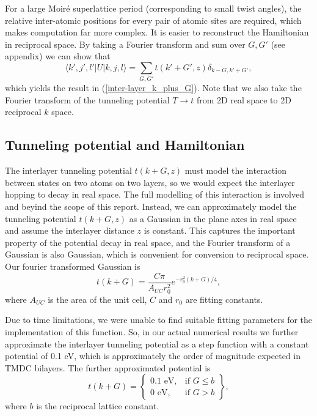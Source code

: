 \documentclass[12pt]{report} %
\begin{document}
  For a large Moir\'e superlattice period (corresponding to small twist angles), the relative inter-atomic positions for every pair of atomic sites are required, which makes computation far more complex. It is easier to reconstruct the Hamiltonian in reciprocal space. By taking a Fourier transform and sum over $G, G'$ (see appendix) we can show that
  \begin{equation}
    \langle k',j',l' | U | k, j, l \rangle = \sum_{G, G'} t(k'+G', z) \delta_{k-G, k'+G'},
    \label{inter-layer_hopping_elements}
  \end{equation}
  which yields the result in (\ref{inter-layer_k_plus_G}). Note that we also take the Fourier transform of the tunneling potential $T \rightarrow t$ from 2D real space to 2D reciprocal $k$ space. 
  
\subsection*{Tunneling potential and Hamiltonian}

The interlayer tunneling potential $t(k + G, z)$ must model the interaction between states on two atoms on two layers, so we would expect the interlayer hopping to decay in real space. The full modelling of this interaction is involved and beyind the scope of this report. Instead, we can approximately model the tunneling potential $t(k + G, z)$ as a Gaussian in the plane axes in real space and assume the interlayer distance $z$ is constant. This captures the important property of the potential decay in real space, and the Fourier transform of a Gaussian is also Gaussian, which is convenient for conversion to reciprocal space. Our fourier transformed Gaussian is
%
\begin{equation}
  t(k + G) = \frac{C\pi}{A_{UC} r_0^2}e^{- r_0^2 (k + G)/4},
  \label{tunneling_potential_gaussian}
\end{equation}
%
where $A_{UC}$ is the area of the unit cell, $C$ and $r_0$ are fitting constants.

Due to time limitations, we were unable to find suitable fitting parameters for the implementation of this function. So, in our actual numerical results we further approximate the interlayer tunneling potential as a step function with a constant potential of 0.1 eV, which is approximately the order of magnitude expected in TMDC bilayers\cite{Conte2019}. The further approximated potential is
%
\begin{equation}
  t(k + G) =
  \left\{ 
  \begin{array}{lr}
    0.1 \text{ eV}, & \text{if } G \leq b\\
    0 \text{ eV}, & \text{if } G > b
  \end{array} 
  \right\},
  \label{tunneling_potential}
\end{equation}
where $b$ is the reciprocal lattice constant.
\end{document}
